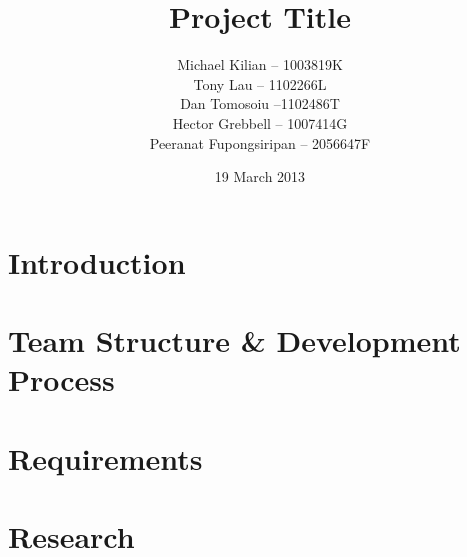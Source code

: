 \documentclass{l3proj}
\begin{document}
\title{Project Title}
\author{Michael Kilian -- 1003819K \\
        Tony Lau -- 1102266L\\
        Dan Tomosoiu --1102486T \\
        Hector Grebbell -- 1007414G \\
        Peeranat Fupongsiripan -- 2056647F}
\date{19 March 2013}
\maketitle

\begin{abstract}

\end{abstract}

\educationalconsent
\tableofcontents
\chapter{Introduction}
\label{introduction}




\chapter{Team Structure \& Development Process}
\label{organisations}




\chapter{Requirements}
\label{requirements}


\chapter{Research}
\label{research}


\end{document}
